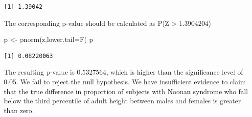 \documentclass[
  letterpaper,
  DIV=11,
  numbers=noendperiod]{scrartcl}
\newenvironment{Shaded}{\begin{snugshade}}{\end{snugshade}}
\newcommand{\AttributeTok}[1]{\textcolor[rgb]{0.40,0.45,0.13}{#1}}
\newcommand{\FunctionTok}[1]{\textcolor[rgb]{0.28,0.35,0.67}{#1}}
\newcommand{\NormalTok}[1]{\textcolor[rgb]{0.00,0.23,0.31}{#1}}
\newcommand{\OtherTok}[1]{\textcolor[rgb]{0.00,0.23,0.31}{#1}}
\begin{document}
\begin{verbatim}
[1] 1.39042
\end{verbatim}

The corresponding p-value should be calculated as P(Z \textgreater{}
1.3904204)

\begin{Shaded}
\begin{Highlighting}[]
\NormalTok{p }\OtherTok{\textless{}{-}} \FunctionTok{pnorm}\NormalTok{(z,}\AttributeTok{lower.tail=}\NormalTok{F)}
\NormalTok{p}
\end{Highlighting}
\end{Shaded}

\begin{verbatim}
[1] 0.08220063
\end{verbatim}

The resulting p-value is 0.5327564, which is higher than the
significance level of 0.05. We fail to reject the null hypothesis. We
have insufficient evidence to claim that the true difference in
proportion of subjects with Noonan syndrome who fall below the third
percentile of adult height between males and females is greater than
zero.
\end{document}
